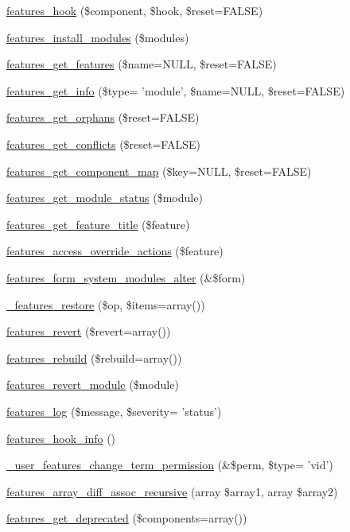 \begin{DoxyCompactItemize}
\item 
\hyperlink{features_8module_aaa5a723655f52c16385d78d0f5997c23}{features\_\-hook} (\$component, \$hook, \$reset=FALSE)
\item 
\hyperlink{features_8module_a379679b547f18695cf0e547fe936b002}{features\_\-install\_\-modules} (\$modules)
\item 
\hyperlink{features_8module_a2bb9e3cf366b99818c231091b8fea3cd}{features\_\-get\_\-features} (\$name=NULL, \$reset=FALSE)
\item 
\hyperlink{features_8module_a03a83ef1f5d1e8033b71b0388e776536}{features\_\-get\_\-info} (\$type= 'module', \$name=NULL, \$reset=FALSE)
\item 
\hyperlink{features_8module_a6aae9f9ebb34fabfe11ae61284dde230}{features\_\-get\_\-orphans} (\$reset=FALSE)
\item 
\hyperlink{features_8module_a0e952cf77cb9bbe9a81d5997d8ce5e70}{features\_\-get\_\-conflicts} (\$reset=FALSE)
\item 
\hyperlink{features_8module_a0b9ee0b432af2d3709e1f413923c3ae2}{features\_\-get\_\-component\_\-map} (\$key=NULL, \$reset=FALSE)
\item 
\hyperlink{features_8module_ac5677f8406f4e9b5b37ae40783742a2e}{features\_\-get\_\-module\_\-status} (\$module)
\item 
\hyperlink{features_8module_aa4ba0e8b4f0d7640d95ea12d67928ca3}{features\_\-get\_\-feature\_\-title} (\$feature)
\item 
\hyperlink{features_8module_aeb1b6b9ab9beb2e78552c06cc86a241c}{features\_\-access\_\-override\_\-actions} (\$feature)
\item 
\hyperlink{features_8module_a8035300a21d0bf61d8cbf8caa4f3c19b}{features\_\-form\_\-system\_\-modules\_\-alter} (\&\$form)
\item 
\hyperlink{features_8module_a0298400d481d56cee72177e00c1777cd}{\_\-features\_\-restore} (\$op, \$items=array())
\item 
\hyperlink{features_8module_a2387a306760f9e3f11596672883ad181}{features\_\-revert} (\$revert=array())
\item 
\hyperlink{features_8module_a059a6b5b807abf2d3004beae665cd41c}{features\_\-rebuild} (\$rebuild=array())
\item 
\hyperlink{features_8module_a7d98a16c1662382dae41746df94b8e86}{features\_\-revert\_\-module} (\$module)
\item 
\hyperlink{features_8module_ad31fc2380edc2e353c945257ffd6b731}{features\_\-log} (\$message, \$severity= 'status')
\item 
\hyperlink{features_8module_a7d3ed140b4b5553cbf7fc46f0bb42af2}{features\_\-hook\_\-info} ()
\item 
\hyperlink{features_8module_a2ce08ffe8a095c32656f9f78c2bb9ac5}{\_\-user\_\-features\_\-change\_\-term\_\-permission} (\&\$perm, \$type= 'vid')
\item 
\hyperlink{features_8module_a5d81c8de392acdca91b2f1f5101f889a}{features\_\-array\_\-diff\_\-assoc\_\-recursive} (array \$array1, array \$array2)
\item 
\hyperlink{features_8module_a354c070d172b313930b395af9b9de90b}{features\_\-get\_\-deprecated} (\$components=array())
\end{DoxyCompactItemize}



